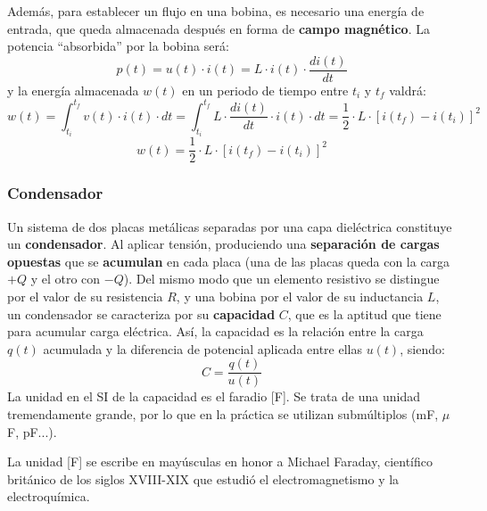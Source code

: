 \documentclass[11pt]{book} %
\begin{document}
	Además, para establecer un flujo en una bobina, es necesario una energía de entrada, que queda almacenada después en forma de \textbf{campo magnético}. La potencia ``absorbida'' por la bobina será:
	\begin{equation*}
		p(t)=u(t)\cdot i(t)=L\cdot i(t)\cdot\dfrac{di(t)}{dt}
	\end{equation*}
	y la energía almacenada $w(t)$ en un periodo de tiempo entre $t_i$ y $t_f$ valdrá:
	\begin{equation*}
		w(t)=\int_{t_i}^{t_f}v(t)\cdot i(t)\cdot dt=\int_{t_i}^{t_f}L\cdot\dfrac{di(t)}{dt}\cdot i(t)\cdot dt=\dfrac{1}{2}\cdot L\cdot [i(t_f)-i(t_i)]^2
	\end{equation*}
	\begin{equation}
		\boxed{w(t)=\dfrac{1}{2}\cdot L\cdot [i(t_f)-i(t_i)]^2}
	\end{equation}
	
	\subsubsection{Condensador}\label{sec.condensador}
	
	Un sistema de dos placas metálicas separadas por una capa dieléctrica constituye un \textbf{condensador}. Al aplicar tensión, produciendo una \textbf{separación de cargas opuestas} que se \textbf{acumulan} en cada placa (una de las placas queda con la carga $+Q$ y el otro con $-Q$). Del mismo modo que un elemento resistivo se distingue por el valor de su resistencia $R$, y una bobina por el valor de su inductancia $L$, un condensador se caracteriza por su \textbf{capacidad} $C$, que es la aptitud que tiene para acumular carga eléctrica. Así, la capacidad es la relación entre la carga $q(t)$ acumulada y la diferencia de potencial aplicada entre ellas $u(t)$, siendo:
	\begin{equation}\label{eq.cqu}
		\boxed{C=\dfrac{q(t)}{u(t)}}
	\end{equation}
	La unidad en el SI de la capacidad es el faradio [F]. Se trata de una unidad tremendamente grande, por lo que en la práctica se utilizan submúltiplos (mF, $\mu$F, pF...). 
	\begin{remark}
		La unidad [F] se escribe en mayúsculas en honor a Michael Faraday, científico británico de los siglos XVIII-XIX que estudió el electromagnetismo y la electroquímica. 
	\end{remark}
	
\end{document}
